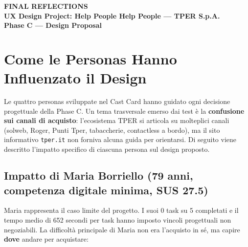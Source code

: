 
\begin{tcolorbox}[colback=primaryColor,colframe=primaryColor,arc=3mm,halign=center,valign=center,height=2.5cm]
    \color{white}\LARGE\bfseries FINAL REFLECTIONS \\[0.2cm]
    \color{white!80}\large UX Design Project: Help People Help People --- TPER S.p.A. \\[0.1cm]
    \color{white!60}\normalsize Phase C --- Design Proposal
\end{tcolorbox}

\vspace{0.5cm}

\section{Come le Personas Hanno Influenzato il Design}

Le quattro personas sviluppate nel Cast Card hanno guidato ogni decisione progettuale della Phase C. Un tema trasversale emerso dai test \`e la \textbf{confusione sui canali di acquisto}: l'ecosistema TPER si articola su molteplici canali (solweb, Roger, Punti Tper, tabaccherie, contactless a bordo), ma il sito informativo \texttt{tper.it} non forniva alcuna guida per orientarsi. Di seguito viene descritto l'impatto specifico di ciascuna persona sul design proposto.

\subsection{Impatto di Maria Borriello (79 anni, competenza digitale minima, SUS 27.5)}

Maria rappresenta il caso limite del progetto. I suoi 0 task su 5 completati e il tempo medio di 652 secondi per task hanno imposto vincoli progettuali non negoziabili. La difficolt\`a principale di Maria non era l'acquisto in s\'e, ma capire \textbf{dove} andare per acquistare:

